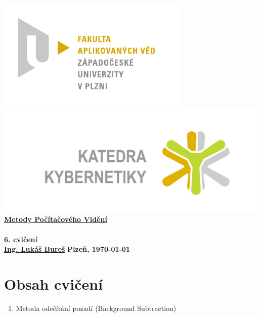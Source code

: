 \documentclass[12pt, a4paper]{article}
\newcommand{\cisloCviceni}{6. cvičení}
\begin{document}
 









 
\begin{titlepage}
\begin{center}
	\includegraphics[trim = 0.6cm 0.5cm 0.9cm 0.5cm, scale=1]{./FAV_logo_cz.pdf}
	\hspace*{\fill}
	\includegraphics[trim = 3.5cm 1.5cm 2.6cm 2cm, scale=0.295]{./KKY_logo_cz.pdf}\\
	\vspace*{\fill}
	\textbf{\Huge{\href{http://www.kky.zcu.cz/cs/courses/mpv}{Metody Počítačového Vidění} \\ ~ \\ \cisloCviceni}}\\
	\vspace*{\fill}
	\textbf{\large{\href{mailto:LBures@kky.zcu.cz}{Ing. Lukáš Bureš}}} \hfill \textbf{\large{Plzeň, \today}}
\end{center}
\end{titlepage}












\section*{Obsah cvičení}
\begin{enumerate}
	\item Metoda odečítání pozadí (Background Subtraction)
\end{enumerate}
\end{document}
